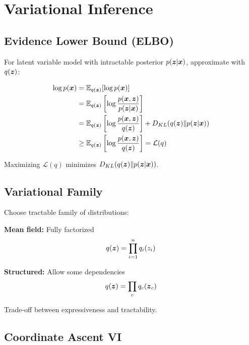 
\section{Variational Inference }
\label{sec:variational-inference}

\subsection{Evidence Lower Bound (ELBO)}

For latent variable model with intractable posterior $p(\boldsymbol{z}|\boldsymbol{x})$, approximate with $q(\boldsymbol{z})$:

\begin{align}
\log p(\boldsymbol{x}) &= \mathbb{E}_{q(\boldsymbol{z})}[\log p(\boldsymbol{x})] \\
&= \mathbb{E}_{q(\boldsymbol{z})}\left[\log \frac{p(\boldsymbol{x}, \boldsymbol{z})}{p(\boldsymbol{z}|\boldsymbol{x})}\right] \\
&= \mathbb{E}_{q(\boldsymbol{z})}\left[\log \frac{p(\boldsymbol{x}, \boldsymbol{z})}{q(\boldsymbol{z})}\right] + D_{KL}(q(\boldsymbol{z}) \| p(\boldsymbol{z}|\boldsymbol{x})) \\
&\geq \mathbb{E}_{q(\boldsymbol{z})}\left[\log \frac{p(\boldsymbol{x}, \boldsymbol{z})}{q(\boldsymbol{z})}\right] = \mathcal{L}(q)
\end{align}

Maximizing $\mathcal{L}(q)$ minimizes $D_{KL}(q(\boldsymbol{z}) \| p(\boldsymbol{z}|\boldsymbol{x}))$.

\subsection{Variational Family}

Choose tractable family of distributions:

\textbf{Mean field:} Fully factorized
\begin{equation}
q(\boldsymbol{z}) = \prod_{i=1}^{n} q_i(z_i)
\end{equation}

\textbf{Structured:} Allow some dependencies
\begin{equation}
q(\boldsymbol{z}) = \prod_{c} q_c(\boldsymbol{z}_c)
\end{equation}

Trade-off between expressiveness and tractability.

\subsection{Coordinate Ascent VI}

